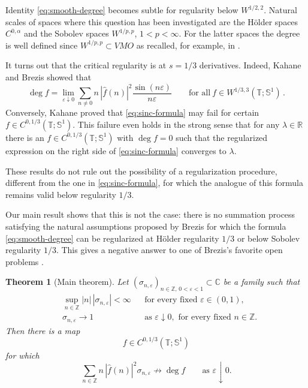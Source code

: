 \documentclass[11pt]{amsart}
\newtheorem{theorem}{Theorem}[section]
\theoremstyle{definition}
\theoremstyle{remark}
\newcommand{\T}{\mathbb T}
\newcommand{\Sone}{\mathbb S^1}
\newcommand{\Z}{\mathbb Z}
\newcommand{\R}{\mathbb R}
\newcommand{\C}{\mathbb C}
\newcommand{\wh}{\widehat}
\DeclareMathOperator{\degmap}{deg}
\begin{document}
Identity \eqref{eq:smooth-degree} becomes subtle for regularity below $W^{1/2,2}$. Natural scales of spaces where this question has been investigated are the H\"older spaces $C^{0,\alpha}$ and the Sobolev spaces $W^{1/p,p}$, $1<p<\infty$. For the latter spaces the degree is well defined since $W^{1/p,p}\subset VMO$ as recalled, for example, in \cite{Brezis2006}.

It turns out that the critical regularity is at $s=1/3$ derivatives. Indeed, Kahane \cite{Kahane2005} and Brezis \cite{Brezis2006} showed that
\begin{equation}\label{eq:sinc-formula}
 \degmap f
 =\lim_{\varepsilon\downarrow0}
 \sum_{n\ne0}n\,|\wh f(n)|^2\frac{\sin(n\varepsilon)}{n\varepsilon}
 \qquad \text{for all}\ f\in W^{1/3,3}(\T;\Sone) \,.
\end{equation}
Conversely, Kahane proved \cite[Proposition~P4]{Kahane2005} that
\eqref{eq:sinc-formula} may fail for certain
$f\in C^{0,1/3}(\T;\Sone)$. This failure even holds in the strong sense
that for any $\lambda\in\R$ there is an
$f\in C^{0,1/3}(\T;\Sone)$ with $\degmap f=0$ such that the regularized
expression on the right side of \eqref{eq:sinc-formula} converges to
$\lambda$.

These results do not rule out the possibility of a regularization procedure, different from the one in \eqref{eq:sinc-formula}, for which the analogue of this formula remains valid below regularity $1/3$.

Our main result shows that this is not the case: there is no summation process satisfying the natural assumptions proposed by Brezis for which the formula \eqref{eq:smooth-degree} can be regularized at H\"older regularity $1/3$ or below Sobolev regularity $1/3$. This gives a negative answer to one of Brezis's favorite open problems \cite[Open Problem~5.6]{Brezis2023}.

\begin{theorem}[Main theorem]\label{thm:main}
Let $(\sigma_{n,\varepsilon})_{n\in\Z,\,0<\varepsilon<1}\subset\C$ be a family such that
\begin{align}
 &\sup_{n\in\Z}|n|\,|\sigma_{n,\varepsilon}|<\infty
 &&\text{for every fixed }\varepsilon\in(0,1),\label{eq:process-bounded}\\
 &\sigma_{n,\varepsilon}\longrightarrow1
 &&\text{as }\varepsilon\downarrow0,\text{ for every fixed }n\in\Z.\label{eq:process-pointwise}
\end{align}
Then there is a map
\[
 f\in C^{0,1/3}(\T;\Sone)
\]
for which
\begin{equation}
    \label{eq:main}
     \sum_{n\in\Z}n\,|\wh f(n)|^2\sigma_{n,\varepsilon}
 \not\longrightarrow\degmap f
 \qquad\text{as }\varepsilon\downarrow0.
\end{equation}
\end{theorem}
\end{document}
